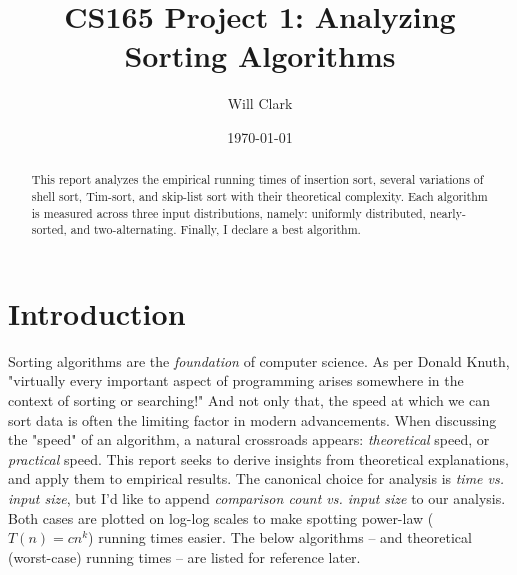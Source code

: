 \documentclass[11pt]{article}
\title{CS165 Project 1: Analyzing Sorting Algorithms}
\author{Will Clark}
\date{\today}
\begin{document}
\maketitle

\begin{abstract}
	This report analyzes the empirical running times of insertion sort, several variations of shell sort, Tim-sort, and skip-list sort with their theoretical complexity. Each algorithm is measured across three input distributions, namely: uniformly distributed, nearly-sorted, and two-alternating. Finally, I declare a best algorithm.
\end{abstract}

\section{Introduction}
Sorting algorithms are the \emph{foundation} of computer science. As per Donald Knuth, "virtually every important aspect of programming arises somewhere in the context of sorting or searching!" And not only that, the speed at which we can sort data is often the limiting factor in modern advancements.
When discussing the "speed" of an algorithm, a natural crossroads appears: \emph{theoretical} speed, or \emph{practical} speed. This report seeks to derive insights from theoretical explanations, and apply them to empirical results. The canonical choice for analysis is \emph{time vs. input size}, but I'd like to append \emph{comparison count vs. input size} to our analysis. Both cases are plotted on log-log scales to make spotting power-law ($T(n) = cn^k$) running times easier. The below algorithms -- and theoretical (worst-case) running times -- are listed for reference later.
\end{document}
